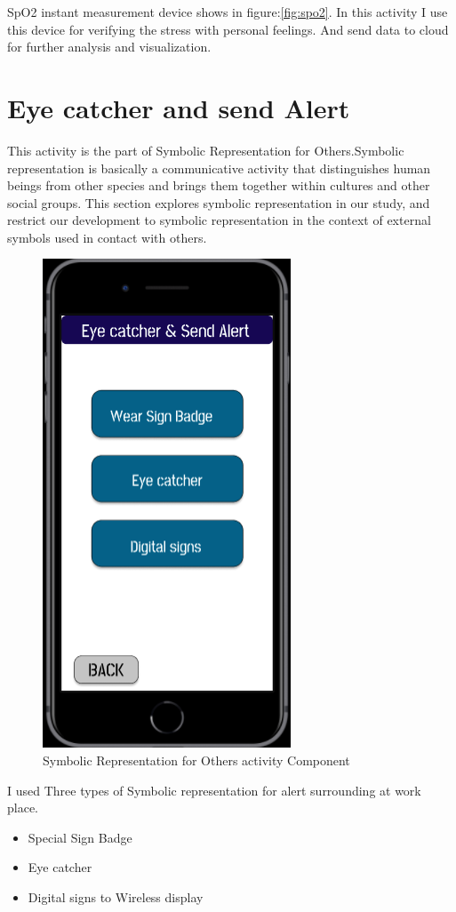 \acs{SpO2} instant measurement device shows in figure:\ref{fig:spo2}. In this activity I use this device for verifying the stress with personal feelings. And send data to cloud for further analysis and visualization.

\section{Eye catcher and send Alert}
This activity is the part of Symbolic Representation for Others.Symbolic representation is basically a communicative activity that distinguishes human beings from other species and brings them together within cultures and other social groups. This section explores symbolic representation in our study, and restrict our development to symbolic representation in the context of external symbols used in contact with others.
\begin{figure}[hbt!] 
  \centering
  \includegraphics[width=0.4\linewidth]{chap4/image4/eye.png}
  \caption[Symbolic Representation for Others activity Component ]{Symbolic Representation for Others activity Component}
  \label{fig:Sign}
\end{figure}
I used Three types of Symbolic representation for alert surrounding at work place.
\begin{itemize}
    \item Special Sign Badge
    \item Eye catcher
    \item Digital signs to Wireless display
\end{itemize}

